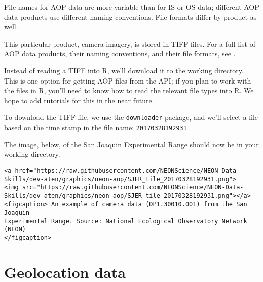 \documentclass[]{book}
\newenvironment{Shaded}{\begin{snugshade}}{\end{snugshade}}
\newcommand{\DataTypeTok}[1]{\textcolor[rgb]{0.13,0.29,0.53}{#1}}
\newcommand{\KeywordTok}[1]{\textcolor[rgb]{0.13,0.29,0.53}{\textbf{#1}}}
\newcommand{\NormalTok}[1]{#1}
\newcommand{\OperatorTok}[1]{\textcolor[rgb]{0.81,0.36,0.00}{\textbf{#1}}}
\newcommand{\StringTok}[1]{\textcolor[rgb]{0.31,0.60,0.02}{#1}}
\begin{document}
File names for AOP data are more variable than for IS or OS data;
different AOP data products use different naming conventions.
File formats differ by product as well.

This particular product, camera imagery, is stored in TIFF files.
For a full list of AOP data products, their naming conventions, and
their file formats, see .

Instead of reading a TIFF into R, we'll download it to the working
directory. This is one option for getting AOP files from the API; if
you plan to work with the files in R, you'll need to know how to
read the relevant file types into R. We hope to add tutorials for
this in the near future.

To download the TIFF file, we use the \texttt{downloader} package, and we'll
select a file based on the time stamp in the file name: \texttt{20170328192931}

\begin{Shaded}
\end{Shaded}

The image, below, of the San Joaquin Experimental Range should now be in your
working directory.

\begin{verbatim}
<a href="https://raw.githubusercontent.com/NEONScience/NEON-Data-Skills/dev-aten/graphics/neon-aop/SJER_tile_20170328192931.png">
<img src="https://raw.githubusercontent.com/NEONScience/NEON-Data-Skills/dev-aten/graphics/neon-aop/SJER_tile_20170328192931.png"></a>
<figcaption> An example of camera data (DP1.30010.001) from the San Joaquin 
Experimental Range. Source: National Ecological Observatory Network (NEON) 
</figcaption>
\end{verbatim}

\hypertarget{geolocation-data}{%
\section{Geolocation data}\label{geolocation-data}}
\end{document}
